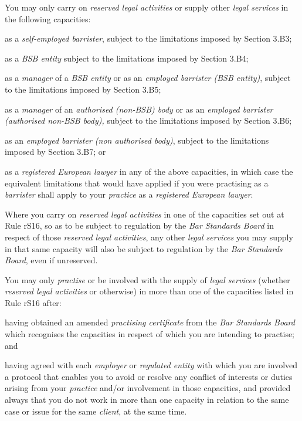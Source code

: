 
You may only carry on \emph{reserved legal activities} or supply other
\emph{legal services} in the following capacities:
\nl\item as a \emph{self-employed barrister}, subject to the limitations
imposed by Section 3.B3;
\item as a \emph{BSB entity} subject to the limitations imposed by Section
3.B4;
\item as a \emph{manager} of a \emph{BSB entity} or as an \emph{employed
barrister (BSB entity)}, subject to the limitations imposed by Section
3.B5;
\item as a \emph{manager} of an \emph{authorised (non-BSB) body} or as an
\emph{employed barrister (authorised non-BSB body),} subject to the
limitations imposed by Section 3.B6;
\item as an \emph{employed barrister (non authorised body)}, subject to the
limitations imposed by Section 3.B7; or
\item as a \emph{registered European lawyer} in any of the above
capacities, in which case the equivalent limitations that would have
applied if you were practising as a \emph{barrister} shall apply to your
\emph{practice} as a \emph{registered European lawyer}.
\ln
{}

Where you carry on \emph{reserved legal activities} in one of the
capacities set out at Rule rS16, so as to be subject to regulation by
the \emph{Bar Standards Board} in respect of those \emph{reserved legal
activities}, any other \emph{legal services} you may supply in that same
capacity will also be subject to regulation by the \emph{Bar Standards
Board}, even if unreserved.


You may only \emph{practise} or be involved with the supply of
\emph{legal services} (whether \emph{reserved legal activities} or
otherwise) in more than one of the capacities listed in Rule rS16 after:
\nl\item having obtained an amended \emph{practising certificate} from the
\emph{Bar Standards Board} which recognises the capacities in respect of
which you are intending to practise; and
\item having agreed with each \emph{employer} or \emph{regulated entity}
with which you are involved a protocol that enables you to avoid or
resolve any conflict of interests or duties arising from your
\emph{practice} and/or involvement in those capacities,
\ln
and provided always that you do not work in more than one capacity in
relation to the same case or issue for the same \emph{client}, at the
same time.

